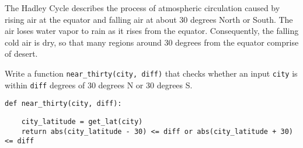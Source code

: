 \question The Hadley Cycle describes the process of atmospheric circulation
caused by rising air at the equator and falling air at about 30 degrees North or
South. The air loses water vapor to rain as it rises from the equator.
Consequently, the falling cold air is dry, so that many regions around 30
degrees from the equator comprise of desert.

Write a function {\tt near\_thirty(city, diff)} that checks whether an input
{\tt city} is within {\tt diff} degrees of 30 degrees N or 30 degrees S.

\begin{lstlisting}
def near_thirty(city, diff):
\end{lstlisting}

\begin{solution}[1.0in]
\begin{lstlisting}
    city_latitude = get_lat(city)
    return abs(city_latitude - 30) <= diff or abs(city_latitude + 30) <= diff
\end{lstlisting}
\end{solution}

